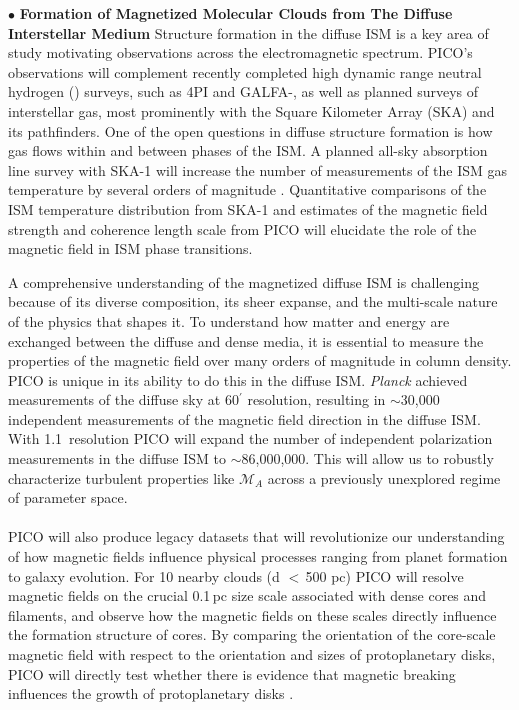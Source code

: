 \documentclass[PICOReport.tex]{subfiles}
\begin{document}
\noindent$\bullet$ {\bf Formation of Magnetized Molecular Clouds from The Diffuse Interstellar Medium} \hspace{0.1in}
Structure formation in the diffuse ISM is a key area of study motivating observations across the electromagnetic spectrum. PICO's observations will complement recently completed high dynamic range neutral hydrogen (\HI) surveys, such as \HI4PI \citep{HI4PI:2016} and GALFA-\hi \citep{Peek:2018}, as well as planned surveys of interstellar gas, most prominently with the Square Kilometer Array (SKA) and its pathfinders. One of the open questions in diffuse structure formation is how gas flows within and between phases of the ISM. A planned all-sky absorption line survey with SKA-1 will increase the number of measurements of the ISM gas temperature by several orders of magnitude \citep{McClure-Griffiths2015}. Quantitative comparisons of the ISM temperature distribution from SKA-1 and estimates of the magnetic field strength and coherence length scale from PICO will elucidate the role of the magnetic field in ISM phase transitions.

A comprehensive understanding of the magnetized diffuse ISM is challenging because of its diverse composition, its sheer expanse, and the multi-scale nature of the physics that shapes it. To understand how matter and energy are exchanged between the diffuse and dense media, it is essential to measure the properties of the magnetic field over many orders of magnitude in column density. PICO is unique in its ability to do this in the diffuse ISM. \textit{Planck} achieved measurements of the diffuse sky at 60$^\prime$ resolution, resulting in $\sim$30,000 independent measurements of the magnetic field direction in the diffuse ISM.  With 1.1\arcmin~resolution PICO will expand the number of independent polarization measurements in the diffuse ISM to $\sim$86,000,000. This will allow us to robustly characterize turbulent properties like $\mathcal{M}_A$ across a previously unexplored regime of parameter space. \vspace{0.1in} \\
%
\\
PICO will also produce legacy datasets that will revolutionize our understanding of how magnetic fields influence physical processes ranging from planet formation to galaxy evolution.  For 10 nearby clouds (d $<$\,500 pc) PICO will resolve magnetic fields on the crucial 0.1\,pc size scale associated with dense cores and filaments, and observe how the magnetic fields on these scales directly influence the formation structure of cores.  By comparing the orientation of the core-scale magnetic field with respect to the orientation and sizes of protoplanetary disks, PICO will directly test whether there is evidence that magnetic breaking influences the growth of protoplanetary disks \citep{allen_2003,li_2014}. 
\end{document}
